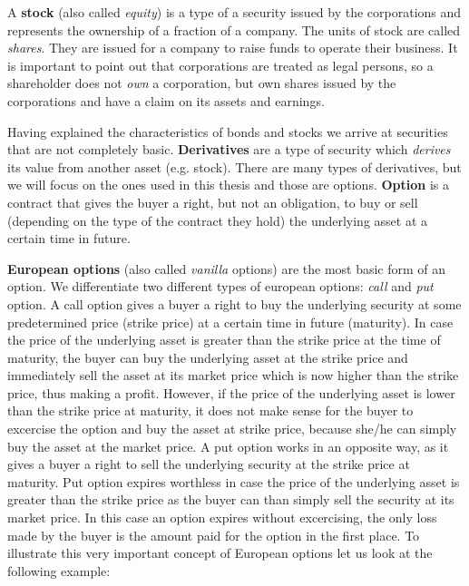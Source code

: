 \documentclass[times, utf8, diplomski]{fer}
\begin{document}
\hfill \break
\indent A \textbf{stock} (also called \textit{equity}) is a type of a security issued by the corporations and represents the ownership of a fraction of a company. The units of stock are called \textit{shares}. They are issued for a company to raise funds to operate their business. It is important to point out that corporations are treated as legal persons, so a shareholder does not \textit{own} a corporation, but own shares issued by the corporations and have a claim on its assets and earnings.

\hfill \break
\indent Having explained the characteristics of bonds and stocks we arrive at securities that are not completely basic. \textbf{Derivatives} are a type of security which \textit{derives} its value from another asset (e.g. stock). There are many types of derivatives, but we will focus on the ones used in this thesis and those are options. \textbf{Option} is a contract that gives the buyer a right, but not an obligation, to buy or sell (depending on the type of the contract they hold) the underlying asset at a certain time in future. 

\hfill \break
\indent \textbf{European options} (also called \textit{vanilla} options) are the most basic form of an option. We differentiate two different types of european options: \textit{call} and \textit{put} option. A call option gives a buyer a right to buy the underlying security at some predetermined price (strike price) at a certain time in future (maturity). In case the price of the underlying asset is greater than the strike price at the time of maturity, the buyer can buy the underlying asset at the strike price and immediately sell the asset at its market price which is now higher than the strike price, thus making a profit. However, if the price of the underlying asset is lower than the strike price at maturity, it does not make sense for the buyer to excercise the option and buy the asset at strike price, because she/he can simply buy the asset at the market price. A put option works in an opposite way, as it gives a buyer a right to sell the underlying security at the strike price at maturity. Put option expires worthless in case the price of the underlying asset is greater than the strike price as the buyer can than simply sell the security at its market price. In this case an option expires without excercising, the only loss made by the buyer is the amount paid for the option in the first place. To illustrate this very important concept of European options let us look at the following example:
\end{document}
